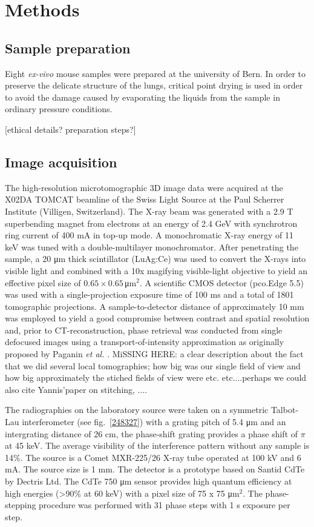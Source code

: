 \section{Methods}\label{sec:methods}
\subsection{Sample preparation}
Eight \emph{ex-vivo} mouse samples were prepared at the university of Bern.
In order to preserve the delicate structure of the lungs, critical point
drying is used in order to avoid the damage caused by evaporating the liquids
from the sample in ordinary pressure conditions.

[ethical details? preparation steps?]

\subsection{Image acquisition}\label{sec:acquisition}
The high-resolution microtomographic 3D image data were acquired at the X02DA TOMCAT beamline of the Swiss Light Source at the Paul Scherrer Institute (Villigen, Switzerland). The X-ray beam was generated with a 2.9 T superbending magnet from electrons at an energy of 2.4 GeV with synchrotron ring current of 400 mA in top-up mode. A monochromatic X-ray energy of 11 keV was tuned with a double-multilayer monochromator. After penetrating the sample, a 20 μm thick scintillator (LuAg:Ce) was used to convert the X-rays into visible light and combined with a 10x magifying visible-light objective to yield an effective pixel size of $0.65 \times 0.65\,$μm$^2$. A scientific CMOS detector (pco.Edge 5.5) was used with a single-projection exposure time of 100 ms and a total of 1801 tomographic projections. A sample-to-detector distance of approximately 10 mm was employed to yield a good compromise between contrast and spatial resolution and, prior to CT-reconstruction, phase retrieval was conducted from single defocused images using a transport-of-intensity approximation as originally proposed by Paganin \textit{et al.} \cite{Paganin2002}. MiSSING HERE: a clear description about the fact that we did several local tomographies; how big was our single field of view and how big approximately the stiched fields of view were etc. etc....perhaps we could also cite Yannis'paper on stitching, ....

The radiographies on the laboratory source were taken on a symmetric
Talbot-Lau interferometer (see fig.~\ref{248327}) with a grating pitch of 5.4 μm and an intergrating
distance of 26 cm, the phase-shift grating provides a phase shift of $\pi$
at 45 keV. The average visibility of the interference pattern without any
sample is 14\%. The source is a Comet MXR-225/26 X-ray tube operated at 100
kV and 6 mA. The source size is 1 mm. The detector is a prototype based on
Santid CdTe by Dectris Ltd. The CdTe 750 μm sensor provides high quantum
efficiency at high energies (>90\% at 60 keV) with a pixel size of 75 x 75
μm$^2$. The phase-stepping procedure was performed with 31 phase steps with
1 s exposure per step.
